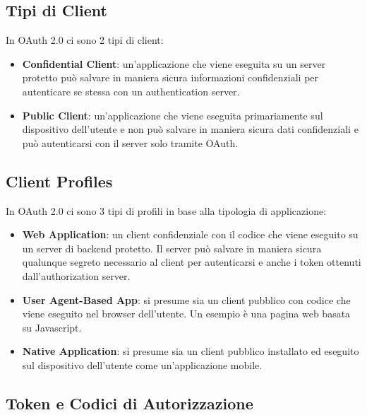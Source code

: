 \vspace{-1em}

\subsection{Tipi di Client}

In OAuth 2.0 ci sono 2 tipi di client:

\begin{itemize}
      \item \textbf{Confidential Client}: un'applicazione che viene eseguita su un server
            protetto può salvare in maniera sicura informazioni confidenziali per
            autenticare se stessa con un authentication server.
      \item \textbf{Public Client}: un'applicazione che viene eseguita primariamente sul
            dispositivo dell'utente e non può salvare in maniera sicura dati confidenziali
            e può autenticarsi con il server solo tramite OAuth.
\end{itemize}

\vspace{-1em}

\subsection{Client Profiles}

In OAuth 2.0 ci sono 3 tipi di profili in base alla tipologia di applicazione:

\begin{itemize}
      \item \textbf{Web Application}: un client confidenziale con il codice che viene
            eseguito su un server di backend protetto. Il server può salvare in maniera
            sicura qualunque segreto necessario al client per autenticarsi e anche i
            token ottenuti dall'authorization server.
      \item \textbf{User Agent-Based App}: si presume sia un client pubblico con codice
            che viene eseguito nel browser dell'utente. Un esempio è una pagina web
            basata su Javascript.
      \item \textbf{Native Application}: si presume sia un client pubblico installato
            ed eseguito sul dispositivo dell'utente come un'applicazione mobile.
\end{itemize}

\subsection{Token e Codici di Autorizzazione}

